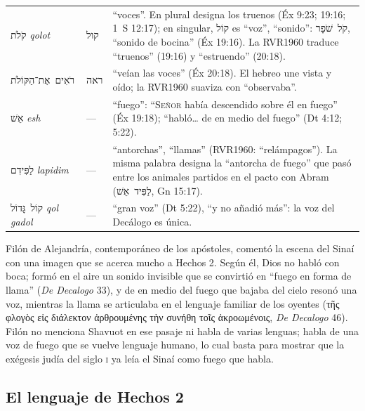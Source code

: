 \documentclass[11pt,letterpaper]{article}
\newcommand{\heb}[1]{\mbox{\foreignlanguage{hebrew}{#1}}}
\newcommand{\grc}[1]{\foreignlanguage{ancientgreek}{#1}}
\newcommand{\SENOR}{\textsc{Señor}}
\begin{document}
\begin{filologia}
\begin{tabular}{@{}L{3.3cm}L{1.5cm}L{9.85cm}@{}}
\heb{קֹלֹת} \emph{qolot} & \heb{קול} & ``voces''. En plural designa los truenos (Éx 9:23; 19:16; 1~S 12:17); en singular, \heb{קוֹל} es ``voz'', ``sonido'': \heb{קֹל שֹׁפָר}, ``sonido de bocina'' (Éx 19:16). La RVR1960 traduce ``truenos'' (19:16) y ``estruendo'' (20:18). \\[2pt]
\heb{רֹאִים אֶת־הַקּוֹלֹת} & \heb{ראה} & ``veían las voces'' (Éx 20:18). El hebreo une vista y oído; la RVR1960 suaviza con ``observaba''. \\[2pt]
\heb{אֵשׁ} \emph{esh} & --- & ``fuego'': ``\SENOR{} había descendido sobre él en fuego'' (Éx 19:18); ``habló\ldots{} de en medio del fuego'' (Dt 4:12; 5:22). \\[2pt]
\heb{לַפִּידִם} \emph{lapidim} & --- & ``antorchas'', ``llamas'' (RVR1960: ``relámpagos''). La misma palabra designa la ``antorcha de fuego'' que pasó entre los animales partidos en el pacto con Abram (\heb{לַפִּיד אֵשׁ}, Gn 15:17). \\[2pt]
\heb{קוֹל גָּדוֹל} \emph{qol gadol} & --- & ``gran voz'' (Dt 5:22), ``y no añadió más'': la voz del Decálogo es única. \\
\end{tabular}
\end{filologia}

Filón de Alejandría, contemporáneo de los apóstoles, comentó la escena del Sinaí con una imagen que se acerca mucho a Hechos 2. Según él, Dios no habló con boca; formó en el aire un sonido invisible que se convirtió en ``fuego en forma de llama'' (\emph{De Decalogo} 33), y de en medio del fuego que bajaba del cielo resonó una voz, mientras la llama se articulaba en el lenguaje familiar de los oyentes (\grc{τῆς φλογὸς εἰς διάλεκτον ἀρθρουμένης τὴν συνήθη τοῖς ἀκροωμένοις}, \emph{De Decalogo} 46). Filón no menciona Shavuot en ese pasaje ni habla de varias lenguas; habla de una voz de fuego que se vuelve lenguaje humano, lo cual basta para mostrar que la exégesis judía del siglo \textsc{i} ya leía el Sinaí como fuego que habla.

\subsection{El lenguaje de Hechos 2}
\end{document}
